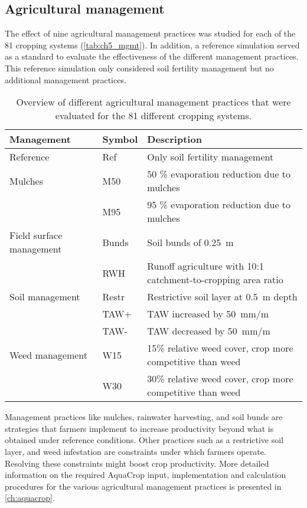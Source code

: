 \subsection{Agricultural management}
The effect of nine agricultural management practices was studied for each of the 81 cropping systems (\autoref{tab:ch5_mgmt}). In addition, a reference simulation served as a standard to evaluate the effectiveness of the different management practices. This reference simulation only considered soil fertility management but no additional management practices. 
\begin{table}
\begin{tabularx}{\textwidth}{llX}
	\caption{Overview of different agricultural management practices that were evaluated for the 81 different cropping systems.}\\
\toprule
\textbf{Management} & \textbf{Symbol} & \textbf{Description} \\
\midrule
Reference & Ref   & Only soil fertility management \\
Mulches & M50   & 50 \% evaporation reduction due to mulches \\
      & M95   & 95 \% evaporation reduction due to mulches \\
Field surface management & Bunds & Soil bunds of \SI{0.25}{m} \\
      & RWH   & Runoff agriculture with 10:1 catchment-to-cropping area ratio \\
Soil management & Restr & Restrictive soil layer at \SI{0.5}{m} depth \\
      & TAW+  & TAW increased by \SI{50}{mm/m} \\
      & TAW-  & TAW decreased by \SI{50}{mm/m} \\
Weed management & W15   & 15\% relative weed cover, crop more competitive than weed \\
      & W30   & 30\% relative weed cover, crop more competitive than weed \\
\bottomrule
\end{tabularx}%
  \label{tab:ch5_mgmt}%
\end{table}
Management practices like mulches, rainwater harvesting, and soil bunds are strategies that farmers implement to increase productivity beyond what is obtained under reference conditions. Other practices such as a restrictive soil layer, and weed infestation are constraints under which farmers operate. Resolving these constraints might boost crop productivity. More detailed information on the required AquaCrop input, implementation and calculation procedures for the various agricultural management practices is presented in \autoref{ch:aquacrop}.

